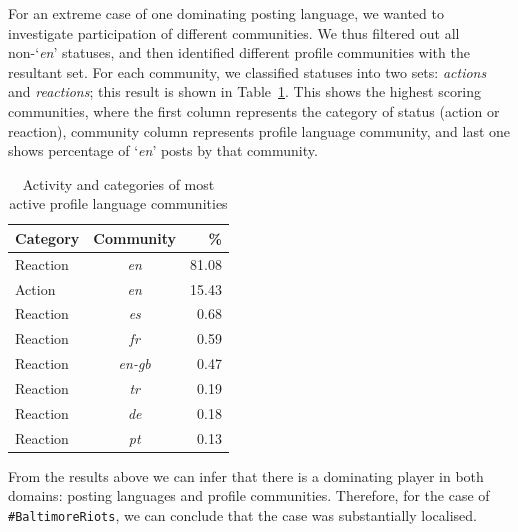 For an extreme case of one dominating posting language, we wanted to
investigate participation of different communities. We thus filtered
out all non-`{\emph{en}}' statuses, and then identified different
profile communities with the resultant set. For each community, we
classified statuses into two sets: {\emph{actions}} and
{\emph{reactions}}; this result is shown in
Table~\ref{tbl:mostactive}. This shows the highest scoring
communities, where the first column represents the category of status
(action or reaction), community column represents profile language
community, and last one shows percentage of `{\emph{en}}' posts by
that community.

\begin{table}[!htb]
\centering
\begin{tabular}{@{}lcr@{}}
\toprule
\textbf{Category} & \textbf{Community} & \textbf{\%} \\ \midrule
Reaction & {\emph{en}} & 81.08 \\
Action & {\emph{en}} & 15.43 \\
Reaction & {\emph{es}} & 0.68 \\
Reaction & {\emph{fr}} & 0.59 \\
Reaction & {\emph{en-gb}} & 0.47 \\
Reaction & {\emph{tr}} & 0.19 \\
Reaction & {\emph{de}} & 0.18 \\
Reaction & {\emph{pt}} & 0.13 \\ \bottomrule
\end{tabular}
\caption{Activity and categories of most active profile language
  communities}
\label{tbl:mostactive}
\end{table}

From the results above we can infer that there is a dominating player
in both domains: posting languages and profile communities. Therefore,
for the case of {\texttt{\#BaltimoreRiots}}, we can conclude that the case was
substantially localised.

